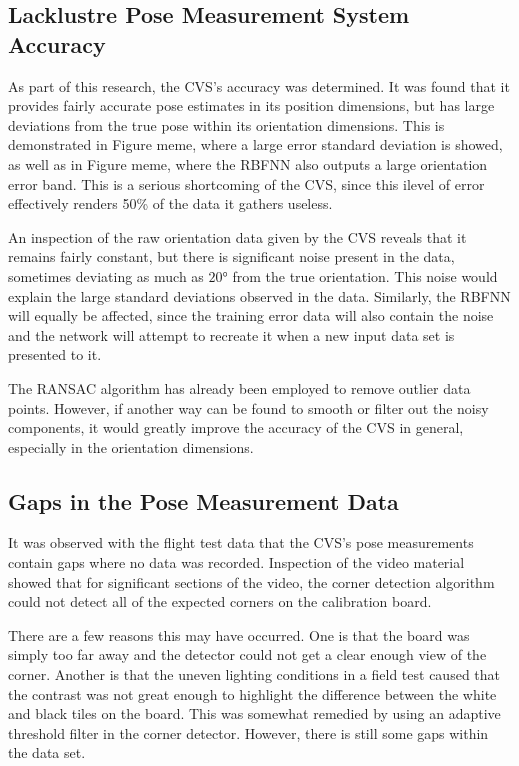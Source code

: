 \subsection{Lacklustre Pose Measurement System Accuracy}

As part of this research, the CVS's accuracy was determined. It was found that it provides fairly accurate pose estimates in its position dimensions, but has large deviations from the true pose within its orientation dimensions. This is demonstrated in Figure meme, where a large error standard deviation is showed, as well as in Figure meme, where the RBFNN also outputs a large orientation error band. This is a serious shortcoming of the CVS, since this ilevel of error effectively renders 50\% of the data it gathers useless. 

An inspection of the raw orientation data given by the CVS reveals that it remains fairly constant, but there is significant noise present in the data, sometimes deviating as much as $\ang{20}$ from the true orientation. This noise would explain the large standard deviations observed in the data. Similarly, the RBFNN will equally be affected, since the training error data will also contain the noise and the network will attempt to recreate it when a new input data set is presented to it. 

The RANSAC algorithm has already been employed to remove outlier data points. However, if another way can be found to smooth or filter out the noisy components, it would greatly improve the accuracy of the CVS in general, especially in the orientation dimensions. 

\subsection{Gaps in the Pose Measurement Data}

It was observed with the flight test data that the CVS's pose measurements contain gaps where no data was recorded. Inspection of the video material showed that for significant sections of the video, the corner detection algorithm could not detect all of the expected corners on the calibration board. 

There are a few reasons this may have occurred. One is that the board was simply too far away and the detector could not get a clear enough view of the corner. Another is that the uneven lighting conditions in a field test caused that the contrast was not great enough to highlight the difference between the white and black tiles on the board. This was somewhat remedied by using an adaptive threshold filter in the corner detector. However, there is still some gaps within the data set. 

